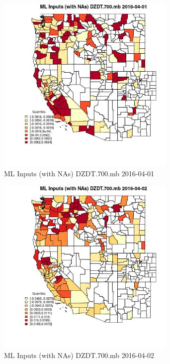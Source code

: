 \begin{figure} 
\centering  
\includegraphics[width=0.77\textwidth]{Code_Outputs/Report_ML_input_PM25_Step4_part_e_de_duplicated_aveswNAs_CountyDZDT700mbMean2016-04-01_2016-04-01.jpg} 
\caption{\label{fig:Report_ML_input_PM25_Step4_part_e_de_duplicated_aveswNAsCountyDZDT700mbMean2016-04-01_2016-04-01}ML Inputs (with NAs) DZDT.700.mb 2016-04-01} 
\end{figure} 
 

\begin{figure} 
\centering  
\includegraphics[width=0.77\textwidth]{Code_Outputs/Report_ML_input_PM25_Step4_part_e_de_duplicated_aveswNAs_CountyDZDT700mbMean2016-04-02_2016-04-02.jpg} 
\caption{\label{fig:Report_ML_input_PM25_Step4_part_e_de_duplicated_aveswNAsCountyDZDT700mbMean2016-04-02_2016-04-02}ML Inputs (with NAs) DZDT.700.mb 2016-04-02} 
\end{figure} 
 
